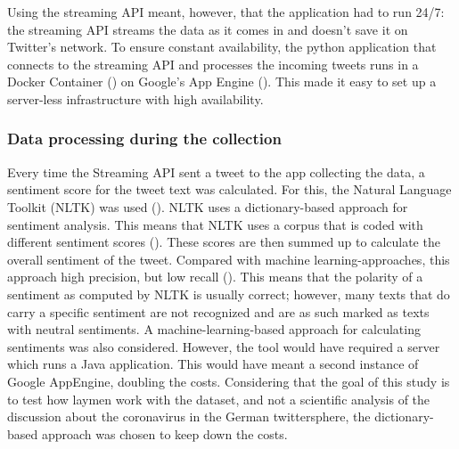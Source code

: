 Using the streaming API meant, however, that the application had to run 24/7: the streaming API streams the data as it comes in and doesn't save it on Twitter's network. To ensure constant availability, the python application that connects to the streaming API and processes the incoming tweets runs in a Docker Container (\cite{merkel2014docker}) on Google's App Engine (\cite{google2020}). This made it easy to set up a server-less infrastructure with high availability.

\subsubsection{Data processing during the collection}
Every time the Streaming API sent a tweet to the app collecting the data, a sentiment score for the tweet text was calculated. For this, the Natural Language Toolkit (NLTK) was used (\cite{loper2002nltk}). NLTK uses a dictionary-based approach for sentiment analysis. This means that NLTK uses a corpus that is coded with different sentiment scores (\cite{haselmayer2017sentiment}). These scores are then summed up to calculate the overall sentiment of the tweet.
Compared with machine learning-approaches, this approach high precision, but low recall (\cite{soroka2015}). This means that the polarity of a sentiment as computed by NLTK is usually correct; however, many texts that do carry a specific sentiment are not recognized and are as such marked as texts with neutral sentiments.
A machine-learning-based approach for calculating sentiments was also considered. However, the tool would have required a server which runs a Java application. This would have meant a second instance of Google AppEngine, doubling the costs. Considering that the goal of this study is to test how laymen work with the dataset, and not a scientific analysis of the discussion about the coronavirus in the German twittersphere, the dictionary-based approach was chosen to keep down the costs.

